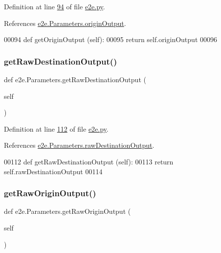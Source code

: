 Definition at line \hyperlink{e2e_8py_source_l00094}{94} of file \hyperlink{e2e_8py_source}{e2e.\+py}.



References \hyperlink{e2e_8py_source_l00092}{e2e.\+Parameters.\+origin\+Output}.


\begin{DoxyCode}
00094     \textcolor{keyword}{def }getOriginOutput (self):
00095         \textcolor{keywordflow}{return} self.originOutput 
00096 
\end{DoxyCode}
\mbox{\label{classe2e_1_1_parameters_a0536c6870c6371025927f435e47704ed}} 
\subsubsection{\texorpdfstring{get\+Raw\+Destination\+Output()}{getRawDestinationOutput()}}
{\footnotesize\ttfamily def e2e.\+Parameters.\+get\+Raw\+Destination\+Output (\begin{DoxyParamCaption}\item[{}]{self }\end{DoxyParamCaption})}



Definition at line \hyperlink{e2e_8py_source_l00112}{112} of file \hyperlink{e2e_8py_source}{e2e.\+py}.



References \hyperlink{e2e_8py_source_l00038}{e2e.\+Parameters.\+raw\+Destination\+Output}.


\begin{DoxyCode}
00112     \textcolor{keyword}{def }getRawDestinationOutput (self):
00113         \textcolor{keywordflow}{return} self.rawDestinationOutput 
00114     
\end{DoxyCode}
\mbox{\label{classe2e_1_1_parameters_a4ed96c7861e649d101984ff5c8056691}} 
\subsubsection{\texorpdfstring{get\+Raw\+Origin\+Output()}{getRawOriginOutput()}}
{\footnotesize\ttfamily def e2e.\+Parameters.\+get\+Raw\+Origin\+Output (\begin{DoxyParamCaption}\item[{}]{self }\end{DoxyParamCaption})}



